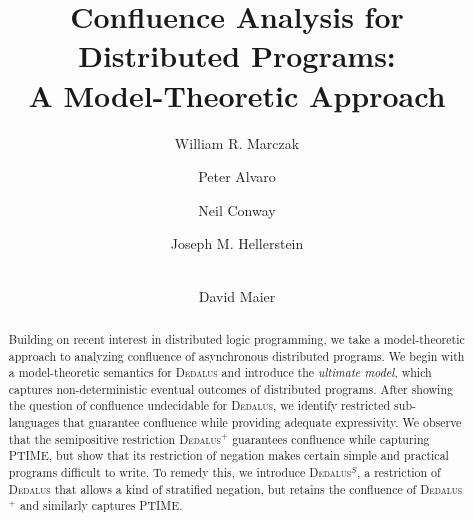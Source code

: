 \documentclass{llncs}
\def\slang{\textsc{Dedalus}$^+$\xspace}
\def\lang{\textsc{Dedalus}\xspace}
\def\plang{\textsc{Dedalus}$^S$\xspace}
\begin{document}
\mainmatter
\title{Confluence Analysis for Distributed Programs:\\A Model-Theoretic Approach}


\author{William R. Marczak \and Peter Alvaro \and Neil Conway \and Joseph M. Hellerstein \and \\ David Maier}




\maketitle

\begin{abstract}
  Building on recent interest in distributed logic programming, we
  take a model-theoretic approach to analyzing confluence of asynchronous
  distributed programs. 
  We begin with a model-theoretic
  semantics for \lang and introduce the \emph{ultimate model}, which captures
  non-deterministic eventual outcomes of distributed programs.  After showing the question of confluence undecidable for \lang, we identify restricted sub-languages that guarantee confluence while providing adequate expressivity.  
We observe that the semipositive restriction \slang guarantees confluence while capturing PTIME, but show that its restriction of negation makes certain simple and practical programs difficult to write.  To remedy this, we introduce \plang, a restriction of
  \lang that allows a kind of stratified negation, but retains the
  confluence of \slang and similarly captures PTIME.
\end{abstract}






%

\begin{spacing}{0.895}

\end{spacing}


\end{document}
